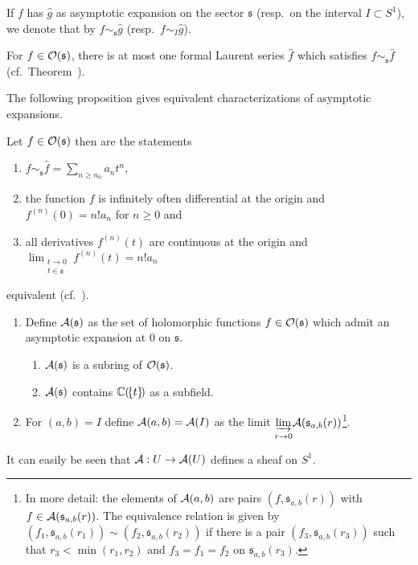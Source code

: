 If $f$ has $\hat g$ as asymptotic expansion on the sector $\mathfrak{s}$ (resp.\
on the interval $I\subset S^1$), we denote that by $f\sim_{\mathfrak{s}}\hat g$
(resp.\ $f\sim_{I}\hat g$).\label{page:notationForAsymptoticExpansion}

\begin{thm}
  For $f\in\mathcal{O}(\mathfrak{s})$, there is at most one formal Laurent series $\hat
  f$ which satisfies $f\sim_{\mathfrak{s}}\hat f$
  (cf.\ Theorem~\cite[Thm.XI-1-5]{hsieh2012basic}).
\end{thm}

The following proposition gives equivalent characterizations of asymptotic
expansions.
\begin{prop}
  Let $f\in\mathcal{O}(\mathfrak{s})$ then are the statements
  \begin{enumerate}
  \item $f\sim_{\mathfrak{s}}\hat f=\sum_{n\geq n_0}a_nt^n$,
  \item the function $f$ is infinitely often differential at the origin and
    $f^{(n)}(0)=n!a_n$ for $n\geq0$ and
  \item all derivatives $f^{(n)}(t)$ are continuous at the origin and
    $\lim_{\substack{t\to0\\t\in\mathfrak{s}}}f^{(n)}(t)=n!a_n$
  \end{enumerate}
  equivalent (cf.~\cite[4.4.Prop.8]{Balser2000Formal}).
\end{prop}

\begin{defn}
  \begin{enumerate}
    \item Define $\mathcal{A}(\mathfrak{s})$ as the set of holomorphic functions
      $f\in\mathcal{O}(\mathfrak{s})$ which admit an asymptotic expansion at $0$ on
      $\mathfrak{s}$.
      \begin{s-rem}
        \begin{enumerate}
          \item
            $\mathcal{A}(\mathfrak{s})$ is a subring of $\mathcal{O}(\mathfrak{s})$.
          \item
            $\mathcal{A}(\mathfrak{s})$ contains $\mathbb{C}(\!\{t\}\!)$ as a subfield.
        \end{enumerate}
      \end{s-rem}
    \item
      For $(a,b)=I$ define $\mathcal{A}(a,b)=\mathcal{A}(I)$ as the limit
      $\underset{r\to0}{\underrightarrow{\lim}}
      \mathcal{A}(\mathfrak{s}_{a,b}(r))$\footnote{In more detail: the
        elements of $\mathcal{A}(a,b)$ are pairs $(f,\mathfrak{s}_{a,b}(r))$ with
        $f\in\mathcal{A}(\mathfrak{s}_{a,b}(r))$. The equivalence relation is given by
        $(f_1,\mathfrak{s}_{a,b}(r_1))\sim(f_2,\mathfrak{s}_{a,b}(r_2))$ if
      there is a pair $(f_3,\mathfrak{s}_{a,b}(r_3))$ such that
      $r_3<\min(r_1,r_2)$ and $f_3=f_1=f_2$ on $\mathfrak{s}_{a,b}(r_3)$.}.
  \end{enumerate}
\end{defn}
It can easily be seen that $\mathcal{A}:U\to\mathcal{A}(U)$ defines a sheaf on $S^1$.

